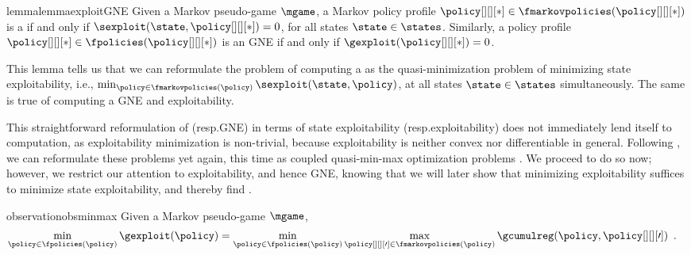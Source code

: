 \begin{restatable}{lemma}{lemmaexploitGNE}\label{lemma:exploit_GNE}
    Given a Markov pseudo-game $\mgame$, a Markov policy profile $\policy[][][*] \in \fmarkovpolicies (\policy[][][*])$ is a \MPGNE{} if and only if $\sexploit (\state, \policy[][][*]) = 0$, for all states $\state \in \states$.
    Similarly, a policy profile $\policy[][][*] \in \fpolicies (\policy[][][*])$ is an GNE if and only if $\gexploit (\policy[][][*]) =0$.
\end{restatable}

This lemma tells us that we can reformulate the problem of computing a \MPGNE{} as the quasi-minimization problem of minimizing state exploitability, i.e., $\min_{\policy \in \fmarkovpolicies (\policy)} \sexploit (\state, \policy)$, at all states $\state \in \states$ simultaneously.
The same is true of computing a GNE and exploitability.

This straightforward reformulation of \MPGNE{} (resp.\@ GNE) in terms of state exploitability (resp.\@ exploitability) does not immediately lend itself to computation, as exploitability minimization is non-trivial, because
exploitability is neither convex nor differentiable in general.
Following \citet{goktas2022exploit},
we can reformulate these problems yet again, this time as coupled quasi-min-max optimization problems \cite{wald1945statistical}.
We proceed to do so now; however, we restrict our attention to exploitability, and hence GNE, knowing that we will later show that minimizing exploitability suffices to minimize state exploitability, and thereby find \MPGNE.

\begin{restatable}{observation}{obsminmax}
\label{obs:exploit_min_to_min_max}
Given a Markov pseudo-game $\mgame$,
    \begin{align}
        \min_{\policy \in \fpolicies (\policy)} \gexploit (\policy)
        &= \min_{\policy \in \fpolicies (\policy)} \max_{\policy[][][\prime] \in \fmarkovpolicies (\policy)} \gcumulreg (\policy, \policy[][][\prime])
        \label{eq:min_max_cumul_regret_formulation}
    \enspace .
    \end{align}   
\end{restatable}

